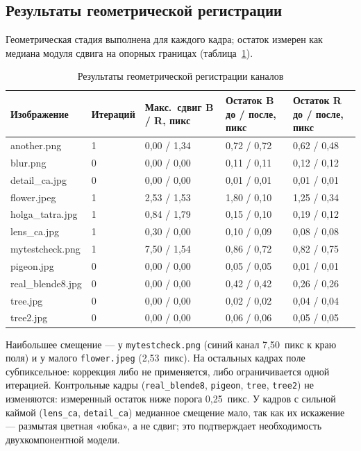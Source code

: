 \documentclass[a4paper,14pt,oneside]{extreport}
\begin{document}
\subsection{Результаты геометрической регистрации}

Геометрическая стадия выполнена для каждого кадра; остаток измерен как
медиана модуля сдвига на опорных границах (таблица~\ref{tab:geometry}).

\begin{table}[H]
\caption{Результаты геометрической регистрации каналов}
\label{tab:geometry}
\small
\begin{tabular}{|p{3.0cm}|p{1.8cm}|p{2.4cm}|p{3.0cm}|p{3.0cm}|}
\hline
Изображение & Итераций & Макс.\ сдвиг B / R, пикс & Остаток B до / после, пикс & Остаток R до / после, пикс \\
\hline
another.png & 1 & 0,00 / 1,34 & 0,72 / 0,72 & 0,62 / 0,48 \\
\hline
blur.png & 0 & 0,00 / 0,00 & 0,11 / 0,11 & 0,12 / 0,12 \\
\hline
detail\_ca.jpg & 0 & 0,00 / 0,00 & 0,01 / 0,01 & 0,01 / 0,01 \\
\hline
flower.jpeg & 1 & 2,53 / 1,53 & 1,80 / 0,10 & 1,25 / 0,34 \\
\hline
holga\_tatra.jpg & 1 & 0,84 / 1,79 & 0,15 / 0,10 & 0,19 / 0,12 \\
\hline
lens\_ca.jpg & 1 & 0,30 / 0,00 & 0,10 / 0,09 & 0,08 / 0,08 \\
\hline
mytestcheck.png & 1 & 7,50 / 1,54 & 0,86 / 0,72 & 0,82 / 0,75 \\
\hline
pigeon.jpg & 0 & 0,00 / 0,00 & 0,05 / 0,05 & 0,01 / 0,01 \\
\hline
real\_blende8.jpg & 0 & 0,00 / 0,00 & 0,42 / 0,42 & 0,26 / 0,26 \\
\hline
tree.jpg & 0 & 0,00 / 0,00 & 0,02 / 0,02 & 0,04 / 0,04 \\
\hline
tree2.jpg & 0 & 0,00 / 0,00 & 0,06 / 0,06 & 0,05 / 0,05 \\
\hline
\end{tabular}
\end{table}

Наибольшее смещение --- у \texttt{mytestcheck.png} (синий канал 7,50~пикс к
краю поля) и у малого \texttt{flower.jpeg} (2,53~пикс). На остальных кадрах
поле субпиксельное: коррекция либо не применяется, либо ограничивается одной
итерацией. Контрольные кадры (\texttt{real\_blende8}, \texttt{pigeon},
\texttt{tree}, \texttt{tree2}) не изменяются: измеренный остаток ниже порога
0{,}25~пикс. У кадров с сильной каймой (\texttt{lens\_ca},
\texttt{detail\_ca}) медианное смещение мало, так как их искажение ---
размытая цветная «юбка», а не сдвиг; это подтверждает необходимость
двухкомпонентной модели.
\end{document}
